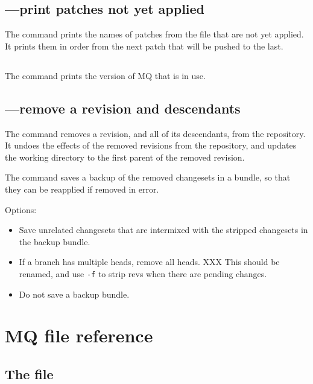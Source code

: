 \subsection{---print patches not yet applied}

The  command prints the names of patches from the
 file that are not yet applied.  It prints them in
order from the next patch that will be pushed to the last.

\subsection{}

The  command prints the version of MQ that is in use.

\subsection{---remove a revision and descendants}

The  command removes a revision, and all of its
descendants, from the repository.  It undoes the effects of the
removed revisions from the repository, and updates the working
directory to the first parent of the removed revision.

The  command saves a backup of the removed changesets in
a bundle, so that they can be reapplied if removed in error.

Options:
\begin{itemize}
\item[\hgopt{strip}{-b}] Save unrelated changesets that are intermixed
  with the stripped changesets in the backup bundle.
\item[\hgopt{strip}{-f}] If a branch has multiple heads, remove all
  heads. XXX This should be renamed, and use \texttt{-f} to strip revs
  when there are pending changes.
\item[\hgopt{strip}{-n}] Do not save a backup bundle.
\end{itemize}

\section{MQ file reference}

\subsection{The  file}

